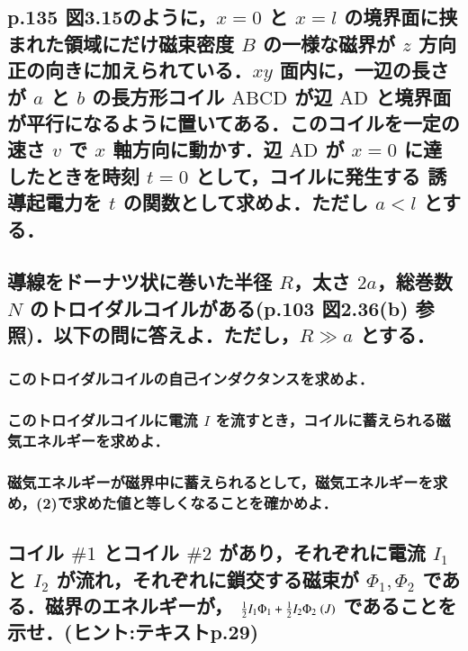 \documentclass[a4paper, 12pt]{bxjsarticle}
\begin{document}
\begin{samepage}
\subsection{p.135 図3.15のように，\(x=0\) と \(x=l\) の境界面に挟まれた領域にだけ磁束密度 \(B\) の一様な磁界が \(z\) 方向正の向きに加えられている．\(xy\) 面内に，一辺の長さが \(a\) と \(b\) の長方形コイル%
 \(\mathrm{ABCD}\) が辺 \(\mathrm{AD}\) と境界面が平行になるように置いてある．このコイルを一定の速さ \(v\) で \(x\) 軸方向に動かす．辺 \(\mathrm{AD}\) が \(x=0\) に達したときを時刻 \(t=0\) として，コイルに発生する%
 誘導起電力を \(t\) の関数として求めよ．ただし \(a<l\) とする．}
\vspace*{12em}
\subsection{導線をドーナツ状に巻いた半径 \(R\)，太さ \(2a\)，総巻数 \(N\) のトロイダルコイルがある(p.103 図2.36(b) 参照)．以下の問に答えよ．ただし，\(R\gg a\) とする．}
\subsubsection{このトロイダルコイルの自己インダクタンスを求めよ．}
\vspace*{6em}
\subsubsection{このトロイダルコイルに電流 \(I\) を流すとき，コイルに蓄えられる磁気エネルギーを求めよ．}
\vspace*{6em}
\subsubsection{磁気エネルギーが磁界中に蓄えられるとして，磁気エネルギーを求め，(2)で求めた値と等しくなることを確かめよ．}
\vspace*{6em}
\end{samepage}
\newpage
\subsection{コイル \(\#1\) とコイル \(\#2\) があり，それぞれに電流 \(I_1\) と \(I_2\) が流れ，それぞれに鎖交する磁束が \(\Phi_1, \Phi_2\) である．磁界のエネルギーが， \(\frac{1}{2} I_1 \Phi_1 + \frac{1}{2} I_2 \Phi_2\; \si(J)\) であることを示せ．(ヒント:テキストp.29)}
\end{document}

